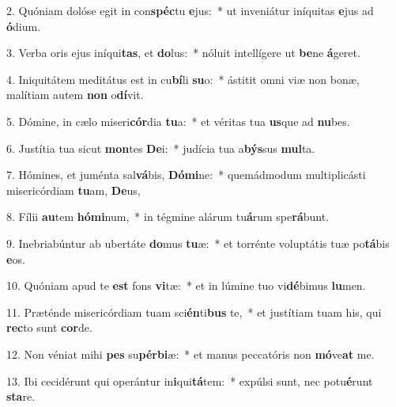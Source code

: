 2. Quóniam dolóse egit in con\textbf{spéc}tu \textbf{e}jus:~*  ut inveniátur iníquitas \textbf{e}jus ad \textbf{ó}dium.\

3. Verba oris ejus iníqui\textbf{tas}, et \textbf{do}lus:~*  nóluit intellígere ut \textbf{be}ne \textbf{á}geret.\

4. Iniquitátem meditátus est in cu\textbf{bí}li \textbf{su}o:~*  ástitit omni viæ non bonæ, malítiam autem \textbf{non} o\textbf{dí}vit.\

5. Dómine, in cælo miseri\textbf{cór}dia \textbf{tu}a:~*  et véritas tua \textbf{us}que ad \textbf{nu}bes.\

6. Justítia tua sicut \textbf{mon}tes \textbf{De}i:~*  judícia tua a\textbf{býs}sus \textbf{mul}ta.\

7. Hómines, et juménta sal\textbf{vá}bis, \textbf{Dó}\textbf{mi}ne:~*  quemádmodum multiplicásti misericórdiam \textbf{tu}am, \textbf{De}us,\

8. Fílii \textbf{au}tem \textbf{hó}\textbf{mi}num,~*  in tégmine alárum tu\textbf{á}rum spe\textbf{rá}bunt.\

9. Inebriabúntur ab ubertáte \textbf{do}mus \textbf{tu}æ:~*  et torrénte voluptátis tuæ po\textbf{tá}bis \textbf{e}os.\

10. Quóniam apud te \textbf{est} fons \textbf{vi}tæ:~*  et in lúmine tuo vi\textbf{dé}bimus \textbf{lu}men.\

11. Præténde misericórdiam tuam sci\textbf{én}ti\textbf{bus} te,~*  et justítiam tuam his, qui \textbf{rec}to sunt \textbf{cor}de.\

12. Non véniat mihi \textbf{pes} su\textbf{pér}\textbf{bi}æ:~*  et manus peccatóris non \textbf{mó}ve\textbf{at} me.\

13. Ibi cecidérunt qui operántur in\textbf{i}qui\textbf{tá}tem:~*  expúlsi sunt, nec potu\textbf{é}runt \textbf{sta}re.\

